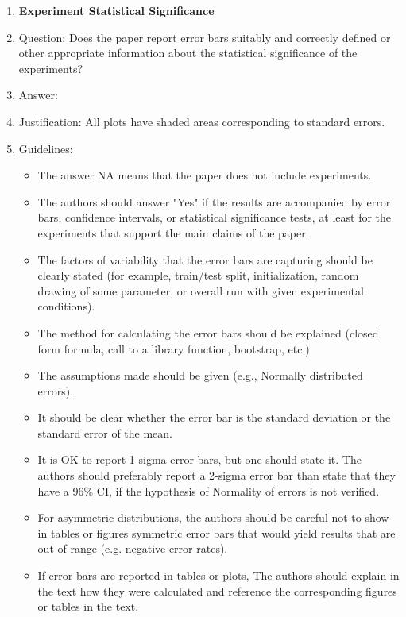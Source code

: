 \documentclass{article}
\theoremstyle{plain}
\theoremstyle{definition}
\theoremstyle{remark}
\theoremstyle{plain}
\begin{document}
\begin{enumerate}
\item {\bf Experiment Statistical Significance}
    \item[] Question: Does the paper report error bars suitably and correctly defined or other appropriate information about the statistical significance of the experiments?
    \item[] Answer: \answerYes{} %
    \item[] Justification: All plots have shaded areas corresponding to standard errors.
    \item[] Guidelines:
    \begin{itemize}
        \item The answer NA means that the paper does not include experiments.
        \item The authors should answer "Yes" if the results are accompanied by error bars, confidence intervals, or statistical significance tests, at least for the experiments that support the main claims of the paper.
        \item The factors of variability that the error bars are capturing should be clearly stated (for example, train/test split, initialization, random drawing of some parameter, or overall run with given experimental conditions).
        \item The method for calculating the error bars should be explained (closed form formula, call to a library function, bootstrap, etc.)
        \item The assumptions made should be given (e.g., Normally distributed errors).
        \item It should be clear whether the error bar is the standard deviation or the standard error of the mean.
        \item It is OK to report 1-sigma error bars, but one should state it. The authors should preferably report a 2-sigma error bar than state that they have a 96\% CI, if the hypothesis of Normality of errors is not verified.
        \item For asymmetric distributions, the authors should be careful not to show in tables or figures symmetric error bars that would yield results that are out of range (e.g. negative error rates).
        \item If error bars are reported in tables or plots, The authors should explain in the text how they were calculated and reference the corresponding figures or tables in the text.
    \end{itemize}


\end{enumerate}
\end{document}

